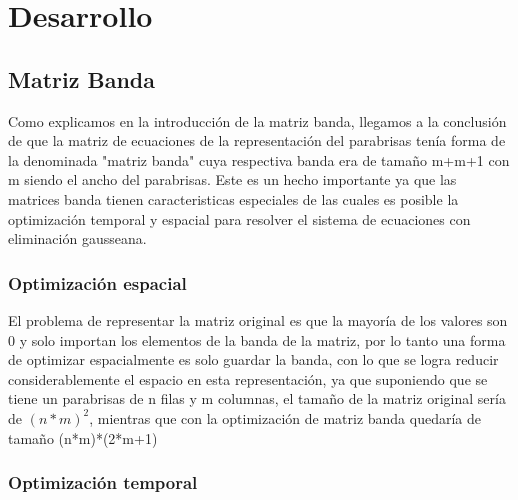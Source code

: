 \section{Desarrollo}

\subsection{Matriz Banda}

Como explicamos en la introducción de la matriz banda, llegamos a la conclusión de que la matriz de ecuaciones de la representación del parabrisas tenía forma de la denominada "matriz banda" cuya respectiva banda era de tamaño m+m+1 con m siendo el ancho del parabrisas. Este es un hecho importante ya que las matrices banda tienen caracteristicas especiales de las cuales es posible la optimización temporal y espacial para resolver el sistema de ecuaciones con eliminación gausseana.

\subsubsection{Optimización espacial}

El problema de representar la matriz original es que la mayoría de los valores son 0 y solo importan los elementos de la banda de la matriz, por lo tanto una forma de optimizar espacialmente es solo guardar la banda, con lo que se logra reducir considerablemente el espacio en esta representación, ya que suponiendo que se tiene un parabrisas de n filas y m columnas, el tamaño de la matriz original sería de $(n*m)^2$, mientras que con la optimización de matriz banda quedaría de tamaño (n*m)*(2*m+1)

\subsubsection{Optimización temporal}
